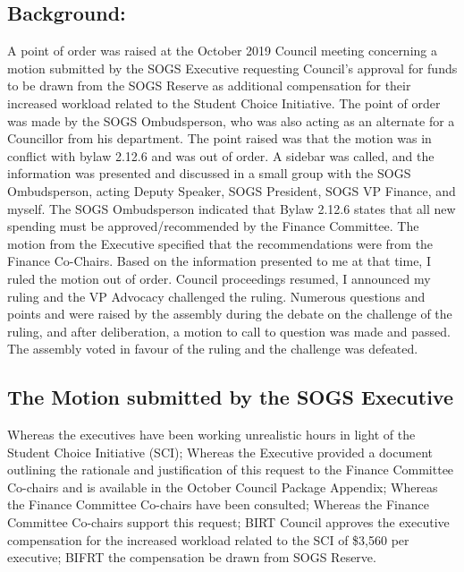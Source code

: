 	\begin{multicols}{2}
\subsection*{Background:}
A point of order was raised at the October 2019 Council meeting concerning a motion submitted by the SOGS Executive requesting Council’s approval for funds to be drawn from the SOGS Reserve as additional compensation for their increased workload related to the Student Choice Initiative.
The point of order was made by the SOGS Ombudsperson, who was also acting as an alternate for a Councillor from his department. The point raised was that the motion was in conflict with bylaw 2.12.6 and was out of order. A sidebar was called, and the information was presented and discussed in a small group with the SOGS Ombudsperson, acting Deputy Speaker, SOGS President, SOGS VP Finance, and myself. The SOGS Ombudsperson indicated that Bylaw 2.12.6 states that all new spending must be approved/recommended by the Finance Committee. The motion from the Executive specified that the recommendations were from the Finance Co-Chairs. Based on the information presented to me at that time, I ruled the motion out of order.
Council proceedings resumed, I announced my ruling and the VP Advocacy challenged the ruling. Numerous questions and points and were raised by the assembly during the debate on the challenge of the ruling, and after deliberation, a motion to call to question was made and passed. The assembly voted in favour of the ruling and the challenge was defeated.

\subsection*{The Motion submitted by the SOGS Executive}
Whereas the executives have been working unrealistic hours in light of the Student Choice Initiative (SCI);\newline
Whereas the Executive provided a document outlining the rationale and justification of this request to the Finance Committee Co-chairs and is available in the October Council Package Appendix;\newline
Whereas the Finance Committee Co-chairs have been consulted;\newline
Whereas the Finance Committee Co-chairs support this request;\newline
BIRT Council approves the executive compensation for the increased workload related to the SCI of \$3,560 per executive;\newline
BIFRT the compensation be drawn from SOGS Reserve. 


\end{multicols}
